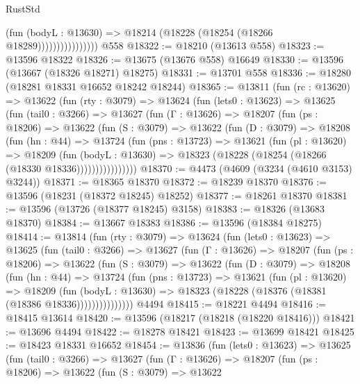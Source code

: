 \begin{lexlean}{RustStd}
\begin{coremodule}
                            (fun (bodyL : @13630) =>
                            @18214 (@18228 (@18254 (@18266 @18289))))))))))))))))
    @558
@18322 := @18210 (@13613 @558)
@18323 := @13596 @18322
@18326 := @13675 (@13676 @558) @16649
@18330 := @13596 (@13667 (@18326 @18271) @18275)
@18331 := @13701 @558
@18336 := @18280 (@18281 @18331 @16652 @18242 @18244)
@18365 := @13811
    (fun (rc : @13620) =>
    @13622
      (fun (rty : @3079) =>
      @13624
        (fun (lets0 : @13623) =>
        @13625
          (fun (tail0 : @3266) =>
          @13627
            (fun (Γ : @13626) =>
            @18207
              (fun (ps : @18206) =>
              @13622
                (fun (S : @3079) =>
                @13622
                  (fun (D : @3079) =>
                  @18208
                    (fun (hn : @44) =>
                    @13724
                      (fun (pns : @13723) =>
                      @13621
                        (fun (pl : @13620) =>
                        @18209
                          (fun (bodyL : @13630) =>
                          @18323 (@18228 (@18254 (@18266 (@18330 @18336))))))))))))))))
@18370 := @4473 (@4609 (@3234 (@4610 @3153) @3244))
@18371 := @18365 @18370
@18372 := @18239 @18370
@18376 := @13596 (@18231 (@18372 @18245) @18252)
@18377 := @18261 @18370
@18381 := @13596 (@13726 (@18377 @18245) @3158)
@18383 := @18326 (@13683 @18370)
@18384 := @13667 @18383
@18386 := @13596 (@18384 @18275)
@18414 := @13814
    (fun (rty : @3079) =>
    @13624
      (fun (lets0 : @13623) =>
      @13625
        (fun (tail0 : @3266) =>
        @13627
          (fun (Γ : @13626) =>
          @18207
            (fun (ps : @18206) =>
            @13622
              (fun (S : @3079) =>
              @13622
                (fun (D : @3079) =>
                @18208
                  (fun (hn : @44) =>
                  @13724
                    (fun (pns : @13723) =>
                    @13621
                      (fun (pl : @13620) =>
                      @18209
                        (fun (bodyL : @13630) =>
                        @18323 (@18228 (@18376 (@18381 (@18386 @18336)))))))))))))))
    @4494
@18415 := @18221 @4494
@18416 := @18415 @13614
@18420 := @13596 (@18217 (@18218 (@18220 @18416)))
@18421 := @13696 @4494
@18422 := @18278 @18421
@18423 := @13699 @18421
@18425 := @18423 @18331 @16652
@18454 := @13836
    (fun (lets0 : @13623) =>
    @13625
      (fun (tail0 : @3266) =>
      @13627
        (fun (Γ : @13626) =>
        @18207
          (fun (ps : @18206) =>
          @13622
            (fun (S : @3079) =>
            @13622

\end{coremodule}
\end{lexlean}
